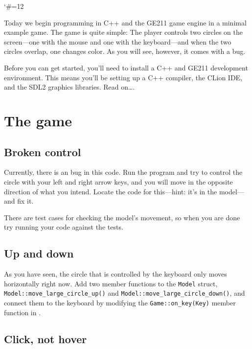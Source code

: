 \documentclass{tufte-handout}
\begin{document}
\catcode`\#=12

\maketitle

Today we begin programming in C++ and the GE211 game engine in a minimal
example game. The game is quite simple: The player controls two circles
on the screen---one with the mouse and one with the keyboard---and when
the two circles overlap, one changes color. As you will see, however, it
comes with a bug.

Before you can get started, you’ll need to install a C++ and GE211
development environment. This means you’ll be setting up a C++ compiler,
the CLion IDE, and the SDL2 graphics libraries. Read on\ldots.

\CxxPrelims*

\section{The game}

\subsection{Broken control}

Currently, there is an bug in this code. Run the program and try to
control the circle with your left and right arrow keys, and you will
move in the opposite direction of what you intend. Locate the code for
this---hint: it's in the model---and fix it.

There are test cases for checking the model's movement, so when you are
done try running your code against the tests.

\subsection{Up and down}

As you have seen, the circle that is controlled by the keyboard only
moves horizontally right now. Add two member functions to the
\verb!Model! struct, \texttt{Model::move\_large\_circle\_up()} and
\texttt{Model::move\_large\_circle\_down()}, and connect them to the
keyboard by modifying the \texttt{Game::on\_key(Key)} member function in
.

\subsection{Click, not hover}
\end{document}
